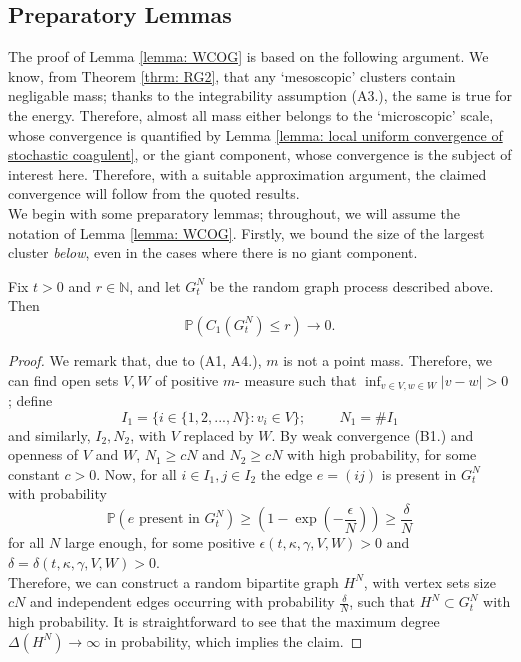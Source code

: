 \subsection{Preparatory Lemmas} The proof of Lemma \ref{lemma: WCOG} is based on the following argument. We know, from Theorem \ref{thrm: RG2}, that any `mesoscopic' clusters contain negligable mass; thanks to the integrability assumption (A3.), the same is true for the energy. Therefore, almost all mass either belongs to the `microscopic' scale, whose convergence is quantified by Lemma \ref{lemma: local uniform convergence of stochastic coagulent}, or the giant component, whose convergence is the subject of interest here. Therefore, with a suitable approximation argument, the claimed convergence will follow from the quoted results.  \medskip\\ We begin with some preparatory lemmas; throughout, we will assume the notation of Lemma \ref{lemma: WCOG}. Firstly, we  bound the size of the largest cluster \emph{below}, even in the cases where there is no giant component. 
\begin{lemma}\label{lemma: lower bound on largest cluster} Fix $t>0$ and $r\in \mathbb{N}$, and let $G^N_t$ be the random graph process described above. Then \begin{equation}
    \mathbb{P}(C_1(G^N_t)\leq r)\rightarrow 0.
\end{equation} \end{lemma}
\begin{proof} We remark that, due to (A1, A4.), $m$ is not a point mass. Therefore, we can find open sets $V, W$ of positive $m$- measure such that $\inf_{v \in V, w \in W} |v-w|>0$; define \begin{equation} I_1=\{i \in \{1,2,...,N\}: v_i \in V\}; \hspace{1cm} N_1=\#I_1
\end{equation} and similarly, $I_2, N_2$, with $V$ replaced by $W$. By weak convergence (B1.) and openness of $V$ and $W$, $N_1\geq cN$ and $N_2\geq cN$ with high probability, for some constant $c>0$. Now, for all $i\in I_1, j\in I_2$ the edge $e=(ij)$ is present in $G^N_t$ with probability \begin{equation}
    \mathbb{P}(e \text{ present in }G^N_t) \geq \left(1-\exp\left(-\frac{\epsilon}{N}\right)\right) \geq \frac{\delta}{N}
\end{equation} for all $N$ large enough, for some positive $\epsilon(t, \kappa, \gamma, V, W)>0$ and $\delta=\delta(t, \kappa, \gamma, V, W)>0$. \medskip \\ Therefore, we can construct a random bipartite graph $H^N$, with vertex sets size $cN$ and independent edges occurring with probability $\frac{\delta}{N}$, such that $H^N \subset G^N_t$ with high probability. It is straightforward to see that the maximum degree $\Delta(H^N)\rightarrow \infty$ in probability, which implies the claim.  \end{proof}

